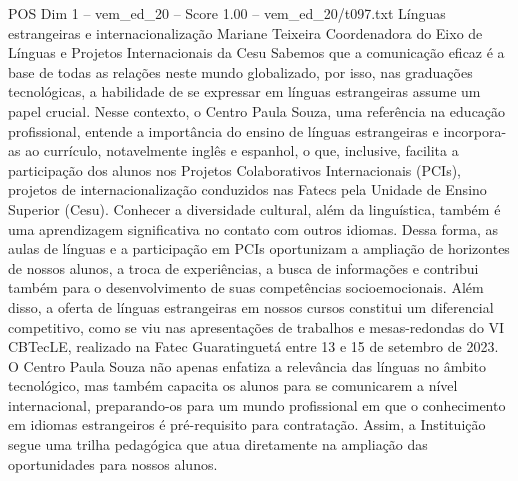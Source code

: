 \begin{textsample}{POS Dim 1 – vem\_ed\_20 – Score 1.00 – vem\_ed\_20/t097.txt}  \label{ex:f1_pos_028}
Línguas estrangeiras e internacionalização Mariane Teixeira Coordenadora do Eixo de Línguas e Projetos Internacionais da Cesu Sabemos que a comunicação eficaz é a base de todas as relações neste mundo globalizado, por isso, nas graduações tecnológicas, a habilidade de se expressar em línguas estrangeiras assume um papel crucial.
Nesse contexto, o Centro Paula Souza, uma referência na educação profissional, entende a importância do ensino de línguas estrangeiras e incorpora-as ao currículo, notavelmente inglês e espanhol, o que, inclusive, facilita a participação dos alunos nos Projetos Colaborativos Internacionais (PCIs), projetos de internacionalização conduzidos nas Fatecs pela Unidade de Ensino Superior (Cesu).
Conhecer a diversidade cultural, além da linguística, também é uma aprendizagem significativa no contato com outros idiomas.
Dessa forma, as aulas de línguas e a participação em PCIs oportunizam a ampliação de horizontes de nossos alunos, a troca de experiências, a busca de informações e contribui também para o desenvolvimento de suas competências socioemocionais.
Além disso, a oferta de línguas estrangeiras em nossos cursos constitui um diferencial competitivo, como se viu nas apresentações de trabalhos e mesas-redondas do VI CBTecLE, realizado na Fatec Guaratinguetá entre 13 e 15 de setembro de 2023.
O Centro Paula Souza não apenas enfatiza a relevância das línguas no âmbito tecnológico, mas também capacita os alunos para se comunicarem a nível internacional, preparando-os para um mundo profissional em que o conhecimento em idiomas estrangeiros é pré-requisito para contratação.
Assim, a Instituição segue uma trilha pedagógica que atua diretamente na ampliação das oportunidades para nossos alunos.

\end{textsample}
